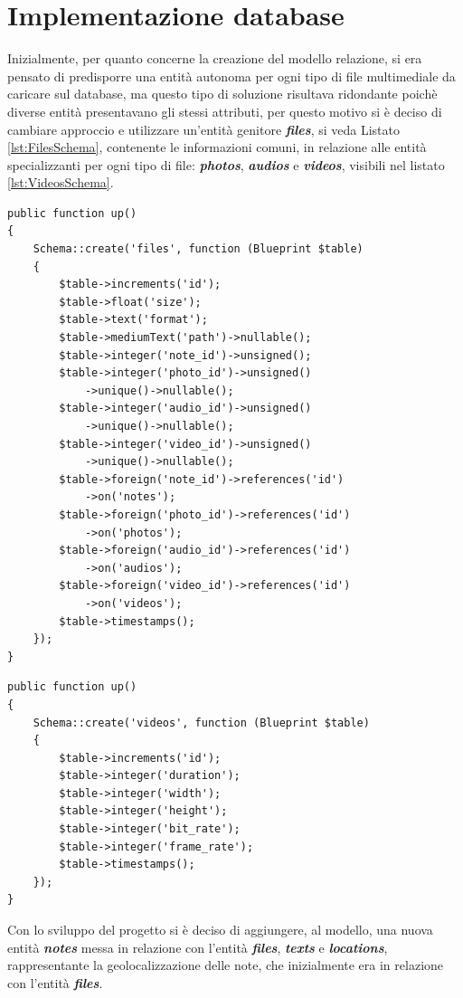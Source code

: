 \section{Implementazione database}
Inizialmente, per quanto concerne la creazione del modello relazione, si era pensato di predisporre una entità autonoma per ogni tipo di file multimediale da caricare sul database, ma questo tipo di soluzione risultava ridondante poichè diverse entità presentavano gli stessi attributi, per questo motivo si è deciso di cambiare approccio e utilizzare un'entità genitore \textit{\textbf{files}}, si veda Listato \ref{lst:FilesSchema}, contenente le informazioni comuni, in relazione alle entità specializzanti per ogni tipo di file: \textit{\textbf{photos}}, \textit{\textbf{audios}} e \textit{\textbf{videos}}, visibili nel listato \ref{lst:VideosSchema}. 
\begin{lstlisting}[caption = Esempio schema tabella files, label={lst:FilesSchema}]
public function up()
{
	Schema::create('files', function (Blueprint $table) 
	{
		$table->increments('id');
		$table->float('size');
		$table->text('format');
		$table->mediumText('path')->nullable();
		$table->integer('note_id')->unsigned();
		$table->integer('photo_id')->unsigned()
			->unique()->nullable();
		$table->integer('audio_id')->unsigned()
			->unique()->nullable();
		$table->integer('video_id')->unsigned()
			->unique()->nullable();
		$table->foreign('note_id')->references('id')
			->on('notes');
		$table->foreign('photo_id')->references('id')
			->on('photos');
		$table->foreign('audio_id')->references('id')
			->on('audios');
		$table->foreign('video_id')->references('id')
			->on('videos');
		$table->timestamps();
	});
}
\end{lstlisting}
\pagebreak
\begin{lstlisting}[caption=Esempio schema tabella videos, label={lst:VideosSchema}]
public function up()
{
	Schema::create('videos', function (Blueprint $table) 
	{
		$table->increments('id');
		$table->integer('duration');
		$table->integer('width');
		$table->integer('height');
		$table->integer('bit_rate');
		$table->integer('frame_rate');
		$table->timestamps();
	});
}
\end{lstlisting}
Con lo sviluppo del progetto si è deciso di aggiungere, al modello, una nuova entità \textit{\textbf{notes}} messa in relazione con l'entità \textit{\textbf{files}}, \textit{\textbf{texts}} e \textit{\textbf{locations}}, rappresentante la geolocalizzazione delle note, che inizialmente era in relazione con l'entità \textit{\textbf{files}}.

